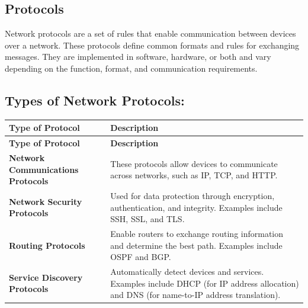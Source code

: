 \documentclass[a4paper,11pt]{article}
\begin{document}
\subsection{Protocols}
Network protocols are a set of rules that enable communication between devices over a network. These protocols define common formats and rules for exchanging messages. They are implemented in software, hardware, or both and vary depending on the function, format, and communication requirements.\\

\subsection{Types of Network Protocols:}
\begin{longtable}{|l|p{10cm}|}
\hline
\textbf{Type of Protocol} & \textbf{Description} \\
\hline
\endfirsthead

\hline
\textbf{Type of Protocol} & \textbf{Description} \\
\hline
\endhead

\hline
\textbf{Network Communications Protocols} & These protocols allow devices to communicate across networks, such as IP, TCP, and HTTP. \\
\hline
\textbf{Network Security Protocols} & Used for data protection through encryption, authentication, and integrity. Examples include SSH, SSL, and TLS. \\
\hline
\textbf{Routing Protocols} & Enable routers to exchange routing information and determine the best path. Examples include OSPF and BGP. \\
\hline
\textbf{Service Discovery Protocols} & Automatically detect devices and services. Examples include DHCP (for IP address allocation) and DNS (for name-to-IP address translation). \\
\hline

\end{longtable}
\end{document}
